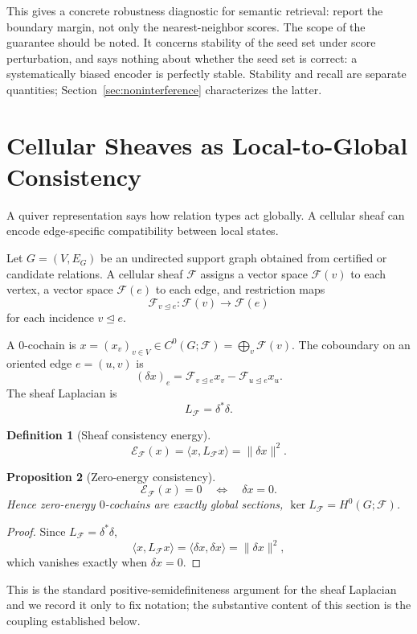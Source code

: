 \documentclass[11pt]{article}
\newtheorem{definition}{Definition}[section]
\newtheorem{proposition}[definition]{Proposition}
\newcommand{\Energy}{\mathcal{E}}
\newcommand{\F}{\mathcal{F}}
\begin{document}
This gives a concrete robustness diagnostic for semantic retrieval: report the boundary margin, not only the nearest-neighbor scores. The scope of the guarantee should be noted. It concerns stability of the seed set under score perturbation, and says nothing about whether the seed set is correct: a systematically biased encoder is perfectly stable. Stability and recall are separate quantities; Section~\ref{sec:noninterference} characterizes the latter.

\section{Cellular Sheaves as Local-to-Global Consistency}
\label{sec:sheaf}

A quiver representation says how relation types act globally. A cellular sheaf can encode edge-specific compatibility between local states.

Let $G=(V,E_G)$ be an undirected support graph obtained from certified or candidate relations. A cellular sheaf $\F$ assigns a vector space $\F(v)$ to each vertex, a vector space $\F(e)$ to each edge, and restriction maps
\[
\F_{v\unlhd e}:\F(v)\to\F(e)
\]
for each incidence $v\unlhd e$.

A $0$-cochain is $x=(x_v)_{v\in V}\in C^0(G;\F)=\bigoplus_v\F(v)$. The coboundary on an oriented edge $e=(u,v)$ is
\[
(\delta x)_e=\F_{v\unlhd e}x_v-\F_{u\unlhd e}x_u.
\]
The sheaf Laplacian is
\[
L_{\F}=\delta^{\ast}\delta.
\]

\begin{definition}[Sheaf consistency energy]
\[
\Energy_{\F}(x)=\langle x,L_{\F}x\rangle=\|\delta x\|^2.
\]
\end{definition}

\begin{proposition}[Zero-energy consistency]
\label{prop:zero-energy}
\[
\Energy_{\F}(x)=0 \quad\Longleftrightarrow\quad \delta x=0.
\]
Hence zero-energy $0$-cochains are exactly global sections, $\ker L_{\F}=H^0(G;\F)$.
\end{proposition}
\begin{proof}
Since $L_{\F}=\delta^{\ast}\delta$,
\[
\langle x,L_{\F}x\rangle=\langle\delta x,\delta x\rangle=\|\delta x\|^2,
\]
which vanishes exactly when $\delta x=0$.
\end{proof}

This is the standard positive-semidefiniteness argument for the sheaf Laplacian \citep{hansen2019spectral} and we record it only to fix notation; the substantive content of this section is the coupling established below.
\end{document}
